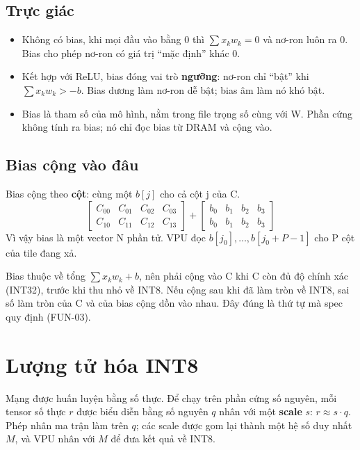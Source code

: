 \documentclass[10pt,a4paper]{article}
\begin{document}
\subsection{Trực giác}
\begin{itemize}
\item Không có bias, khi mọi đầu vào bằng 0 thì $\sum x_k w_k = 0$ và nơ-ron luôn ra 0. Bias cho phép nơ-ron có giá trị “mặc định” khác 0.
\item Kết hợp với ReLU, bias đóng vai trò \textbf{ngưỡng}: nơ-ron chỉ “bật” khi $\sum x_k w_k > -b$. Bias dương làm nơ-ron dễ bật; bias âm làm nó khó bật.
\item Bias là tham số của mô hình, nằm trong file trọng số cùng với W. Phần cứng không tính ra bias; nó chỉ đọc bias từ DRAM và cộng vào.
\end{itemize}

\subsection{Bias cộng vào đâu}
Bias cộng theo \textbf{cột}: cùng một $b[j]$ cho cả cột j của C.
\[
\begin{bmatrix} C_{00} & C_{01} & C_{02} & C_{03} \\ C_{10} & C_{11} & C_{12} & C_{13} \end{bmatrix}
+
\begin{bmatrix} b_0 & b_1 & b_2 & b_3 \\ b_0 & b_1 & b_2 & b_3 \end{bmatrix}
\]
Vì vậy bias là một vector N phần tử. VPU đọc $b[j_0], \ldots, b[j_0+P-1]$ cho P cột của tile đang xả.

\begin{notebox}
Bias thuộc về tổng $\sum x_k w_k + b$, nên phải cộng vào C khi C còn đủ độ chính xác (INT32), trước khi thu nhỏ về INT8. Nếu cộng sau khi đã làm tròn về INT8, sai số làm tròn của C và của bias cộng dồn vào nhau. Đây đúng là thứ tự mà spec quy định (FUN-03).
\end{notebox}

\section{Lượng tử hóa INT8}\label{sec:3}

\begin{keypoint}
Mạng được huấn luyện bằng số thực. Để chạy trên phần cứng số nguyên, mỗi tensor số thực $r$ được biểu diễn bằng số nguyên $q$ nhân với một \textbf{scale} $s$: $r ≈ s \cdot q$. Phép nhân ma trận làm trên $q$; các scale được gom lại thành một hệ số duy nhất $M$, và VPU nhân với $M$ để đưa kết quả về INT8.
\end{keypoint}
\end{document}
